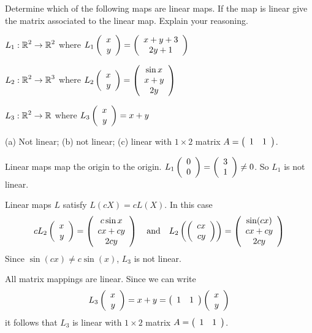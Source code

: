 \documentclass{ximera}
\author{Marty Golubitsky}
\begin{document}
\begin{exercise}\label{c4.3.6A}

Determine which of the following maps are linear maps.  If the map is linear give the matrix associated to the linear map. Explain your reasoning.
\begin{enumeratea}

\item $L_1:\R^2\to\R^2$ where $L_1\Matrix{x\\y} = \Matrixc{x + y+ 3\\ 2y +1}$

\item $L_2:\R^2\to\R^3$ where $L_2\Matrix{x\\y} = \Matrixc{\sin x\\ x + y\\ 2y}$
 
\item $L_3:\R^2\to\R$ where $L_3\Matrix{x\\y} = x + y $
  
\end{enumeratea}
  
\begin{solution}

\ans (a) Not linear; (b) not linear; (c) linear with $1\times 2$ matrix $A= \Matrix{1 & 1}$.

\soln 
\begin{enumeratea}

\item Linear maps map the origin to the origin.  $L_1\Matrix{0\\0} = \Matrix{3\\1} \neq 0$. So $L_1$ is not linear.

\item Linear maps $L$ satisfy $L(cX) = cL(X)$.  In this case 
\[
cL_2\Matrix{x\\y} =  \Matrixc{c\sin x\\ cx + cy\\ 2cy} \AND
L_2\left(\Matrix{cx\\cy}\right) =  \Matrixc{\sin(cx)\\ cx + cy\\ 2cy}
\]
Since $\sin(cx)\neq c\sin(x)$, $L_3$ is not linear.

\item All matrix mappings are linear.  Since we can write
\[
L_3 \Matrix{x\\y} = x+ y = \Matrix{1 &1} \Matrix{x\\y}  
\]
it follows that $L_3$ is linear with $1\times 2$ matrix $A =  \Matrix{1 &1}$.
\end{enumeratea}


\end{solution}
\end{exercise}
\end{document}
